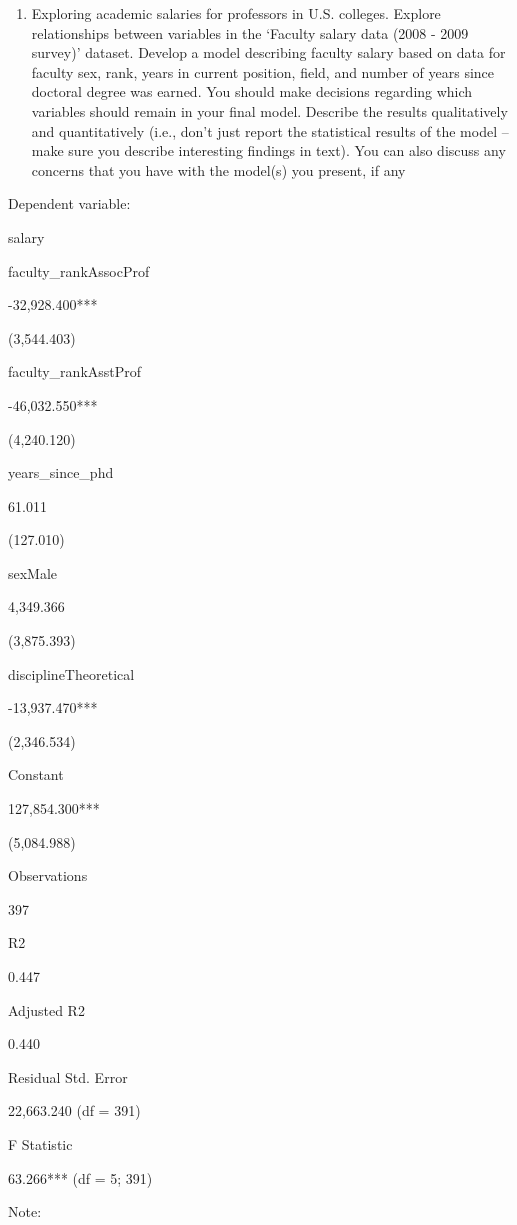 \documentclass[]{article}
\providecommand{\tightlist}{%
  \setlength{\itemsep}{0pt}\setlength{\parskip}{0pt}}
\begin{document}
\begin{enumerate}
\def\labelenumi{\arabic{enumi}.}
\setcounter{enumi}{3}
\tightlist
\item
  Exploring academic salaries for professors in U.S. colleges. Explore
  relationships between variables in the `Faculty salary data (2008 -
  2009 survey)' dataset. Develop a model describing faculty salary based
  on data for faculty sex, rank, years in current position, field, and
  number of years since doctoral degree was earned. You should make
  decisions regarding which variables should remain in your final model.
  Describe the results qualitatively and quantitatively (i.e., don't
  just report the statistical results of the model -- make sure you
  describe interesting findings in text). You can also discuss any
  concerns that you have with the model(s) you present, if any
\end{enumerate}

Dependent variable:

salary

faculty\_rankAssocProf

-32,928.400***

(3,544.403)

faculty\_rankAsstProf

-46,032.550***

(4,240.120)

years\_since\_phd

61.011

(127.010)

sexMale

4,349.366

(3,875.393)

disciplineTheoretical

-13,937.470***

(2,346.534)

Constant

127,854.300***

(5,084.988)

Observations

397

R2

0.447

Adjusted R2

0.440

Residual Std. Error

22,663.240 (df = 391)

F Statistic

63.266*** (df = 5; 391)

Note:
\end{document}
